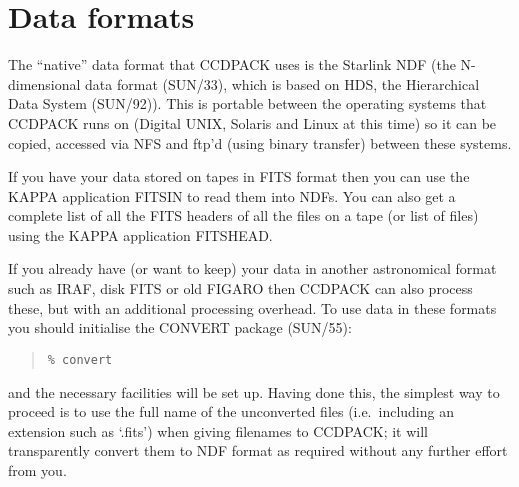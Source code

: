\documentclass[twoside,11pt]{article}
\newcommand{\xref}[3]{#1}
\newcommand{\xlabel}[1]{}
\renewcommand{\_}{\texttt{\symbol{95}}}
\newenvironment{myquote}{\begin{quote}\begin{small}}{\end{small}\end{quote}}
\begin{document}
\section{Data\label{datatypes}\xlabel{datatypes} formats}
The ``native'' data format that CCDPACK uses is the Starlink NDF (the
N-dimensional data format (\xref{SUN/33}{sun33}{}), which is based on
HDS, the Hierarchical Data System \xref{(SUN/92)}{sun92}{}).  This is
portable between the operating systems that CCDPACK runs on (Digital
UNIX, Solaris and Linux at this time) so it can be copied, accessed
via NFS and ftp'd (using binary transfer) between these systems.

If you have your data stored on tapes in FITS format then you can use
the \xref{KAPPA}{sun95}{} application \xref{FITSIN}{sun95}{FITSIN} to
read them into NDFs. You can also get a complete list of all the FITS
headers of all the files on a tape (or list of files) using the KAPPA
application \xref{FITSHEAD}{sun95}{FITSHEAD}.

If you already have (or want to keep) your data in another
astronomical format such as IRAF, disk FITS or old FIGARO then CCDPACK
can also process these, but with an additional processing overhead. To
use data in these formats you should initialise the CONVERT package
(\xref{SUN/55}{sun55}{}):
\begin{myquote}
\begin{verbatim}
% convert
\end{verbatim}
\end{myquote}
and the necessary facilities will be set up. 
Having done this, the simplest way to proceed is to use the
full name of the unconverted files (i.e.\ including an extension 
such as `.fits') when giving filenames to CCDPACK; it will
transparently convert them to NDF format as required without 
any further effort from you.
\end{document}

